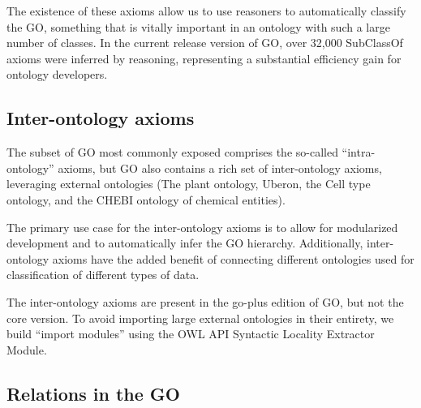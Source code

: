 \documentclass{llncs}
\begin{document}
The existence of these axioms allow us to use reasoners to
automatically classify the GO, something that is vitally important in
an ontology with such a large number of classes. In the current
release version of GO, over 32,000 SubClassOf axioms were inferred by
reasoning, representing a substantial efficiency gain for ontology
developers.




\subsection{Inter-ontology axioms}

The subset of GO most commonly exposed comprises the so-called
``intra-ontology'' axioms, but GO also contains a rich set of
inter-ontology axioms, leveraging external ontologies (The plant
ontology, Uberon, the Cell type ontology, and the CHEBI ontology of
chemical entities).

The primary use case for the inter-ontology axioms is to allow for
modularized development and to automatically infer the GO
hierarchy. Additionally, inter-ontology axioms have the added benefit
of connecting different ontologies used for classification of
different types of data.

The inter-ontology axioms are present in the go-plus edition of GO,
but not the core version. To avoid importing large external ontologies
in their entirety, we build ``import modules'' using the OWL API
Syntactic Locality Extractor Module.

\subsection{Relations in the GO}
\end{document}
